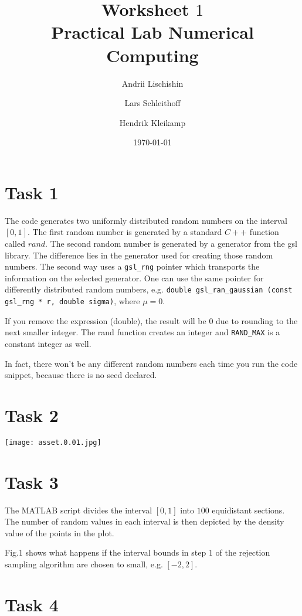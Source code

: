 \documentclass[10pt,a4paper]{article}
\begin{document}
\title{Worksheet $1$\\
\small{Practical Lab Numerical Computing}}
\author{Andrii Lischishin \and Lars Schleithoff \and Hendrik Kleikamp}
\date{\today}
\maketitle

\section*{Task 1}

The code generates two uniformly distributed random numbers on the interval $[0,1]$. The first random number is generated by a standard $C++$ function called $rand$.
The second random number is generated by a generator from the gsl library.
The difference lies in the generator used for creating those random numbers. The second way uses a \texttt{gsl\_rng} pointer which transports the information on the selected generator. 
One can use the same pointer for differently distributed random numbers, e.g. \texttt{double gsl\_ran\_gaussian (const gsl\_rng * r, double sigma)}, where $\mu=0$. 

If you remove the expression (double), the result will be $0$ due to rounding to the next smaller integer. The rand function creates an integer and \texttt{RAND\_MAX} is a constant integer as well. 

In fact, there won't be any different random numbers each time you run the code snippet, because there is no seed declared. 

\section*{Task 2}

\texttt{[image: asset.0.01.jpg]}

\section*{Task 3}

The MATLAB script divides the interval $[0,1]$ into $100$ equidistant sections. The number of random values in each interval is then depicted by the density value of the points in the plot.

Fig.1 shows what happens if the interval bounds in step $1$ of the rejection sampling algorithm are chosen to small, e.g. $[-2,2]$.  


\section*{Task 4}
\end{document}

